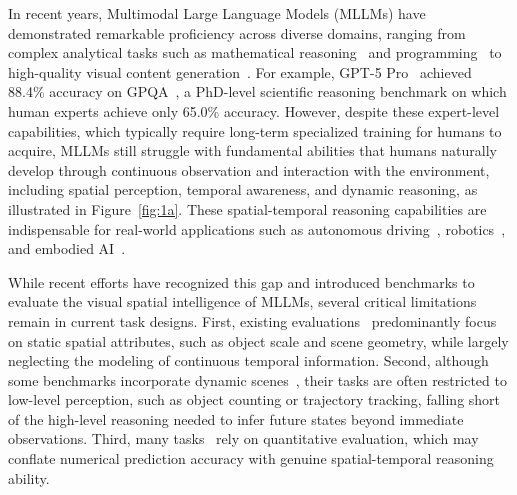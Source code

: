 In recent years, Multimodal Large Language Models (MLLMs) have demonstrated remarkable proficiency across diverse domains, ranging from complex analytical tasks such as mathematical reasoning~\citep{MathVista,MATH-Vision,MATHVERSE} and programming~\citep{MMCode,Design2Code} to high-quality visual content generation~\citep{Emu3,NExT-GPT,MiniGPT-5}. 
For example, GPT-5 Pro~\citep{GPT-5} achieved 88.4\% accuracy on GPQA~\citep{GPQA}, a PhD-level scientific reasoning benchmark on which human experts achieve only 65.0\% accuracy.
However, despite these expert-level capabilities, which typically require long-term specialized training for humans to acquire, MLLMs still struggle with fundamental abilities that humans naturally develop through continuous observation and interaction with the environment, including spatial perception, temporal awareness, and dynamic reasoning, as illustrated in Figure~\ref{fig:1a}.
These spatial-temporal reasoning capabilities are indispensable for real-world applications such as autonomous driving~\citep{LMDrive,DriveLM,DriveGPT4}, robotics~\citep{OpenVLA,RT-2}, and embodied AI~\citep{SayCan,PaLM-E}.

While recent efforts have recognized this gap and introduced benchmarks to evaluate the visual spatial intelligence of MLLMs, several critical limitations remain in current task designs. 
First, existing evaluations~\citep{OmniSpatial,MMSI-Video-Bench,SpaceR,VSI-Bench,Cambrian-S,SPAR-Bench} predominantly focus on static spatial attributes, such as object scale and scene geometry, while largely neglecting the modeling of continuous temporal information. 
Second, although some benchmarks incorporate dynamic scenes~\citep{Dyn-Bench,STI-Bench,OST-Bench,VideoLoom,MLLM-4D,DSI-Bench,DSR-Bench,VLM4D}, their tasks are often restricted to low-level perception, such as object counting or trajectory tracking, falling short of the high-level reasoning needed to infer future states beyond immediate observations. 
Third, many tasks~\citep{STI-Bench,VideoLoom,MLLM-4D,DSR-Bench} rely on quantitative evaluation, which may conflate numerical prediction accuracy with genuine spatial-temporal reasoning ability.

